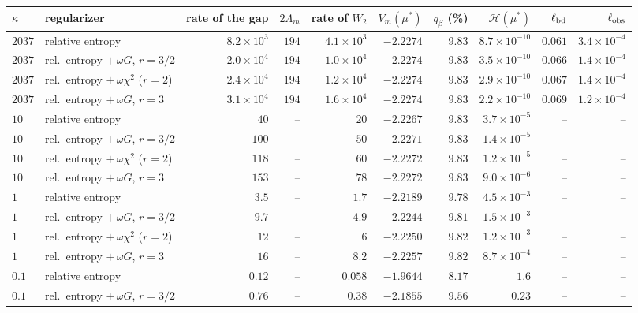 \setlength{\tabcolsep}{4pt}\begin{tabular}{llrrrrrrrr}
\toprule
$\kappa$ & regularizer & rate of the gap & $2\Lambda_m$ & rate of $W_2$ & $V_m(\mu^*)$ & $q_\beta$ (\%) & $\mathcal H(\mu^*)$ & $\ell_{\rm bd}$ & $\ell_{\rm obs}$ \\
\midrule
$2037$ & relative entropy & $8.2\times10^{3}$ & $194$ & $4.1\times10^{3}$ & $-2.2274$ & $9.83$ & $8.7\times10^{-10}$ & $0.061$ & $3.4\times10^{-4}$ \\
$2037$ & rel.\ entropy $+\,\omega G$, $r=3/2$ & $2.0\times10^{4}$ & $194$ & $1.0\times10^{4}$ & $-2.2274$ & $9.83$ & $3.5\times10^{-10}$ & $0.066$ & $1.4\times10^{-4}$ \\
$2037$ & rel.\ entropy $+\,\omega\chi^2$ ($r=2$) & $2.4\times10^{4}$ & $194$ & $1.2\times10^{4}$ & $-2.2274$ & $9.83$ & $2.9\times10^{-10}$ & $0.067$ & $1.4\times10^{-4}$ \\
$2037$ & rel.\ entropy $+\,\omega G$, $r=3$ & $3.1\times10^{4}$ & $194$ & $1.6\times10^{4}$ & $-2.2274$ & $9.83$ & $2.2\times10^{-10}$ & $0.069$ & $1.2\times10^{-4}$ \\
$10$ & relative entropy & $40$ & -- & $20$ & $-2.2267$ & $9.83$ & $3.7\times10^{-5}$ & -- & -- \\
$10$ & rel.\ entropy $+\,\omega G$, $r=3/2$ & $100$ & -- & $50$ & $-2.2271$ & $9.83$ & $1.4\times10^{-5}$ & -- & -- \\
$10$ & rel.\ entropy $+\,\omega\chi^2$ ($r=2$) & $118$ & -- & $60$ & $-2.2272$ & $9.83$ & $1.2\times10^{-5}$ & -- & -- \\
$10$ & rel.\ entropy $+\,\omega G$, $r=3$ & $153$ & -- & $78$ & $-2.2272$ & $9.83$ & $9.0\times10^{-6}$ & -- & -- \\
$1$ & relative entropy & $3.5$ & -- & $1.7$ & $-2.2189$ & $9.78$ & $4.5\times10^{-3}$ & -- & -- \\
$1$ & rel.\ entropy $+\,\omega G$, $r=3/2$ & $9.7$ & -- & $4.9$ & $-2.2244$ & $9.81$ & $1.5\times10^{-3}$ & -- & -- \\
$1$ & rel.\ entropy $+\,\omega\chi^2$ ($r=2$) & $12$ & -- & $6$ & $-2.2250$ & $9.82$ & $1.2\times10^{-3}$ & -- & -- \\
$1$ & rel.\ entropy $+\,\omega G$, $r=3$ & $16$ & -- & $8.2$ & $-2.2257$ & $9.82$ & $8.7\times10^{-4}$ & -- & -- \\
$0.1$ & relative entropy & $0.12$ & -- & $0.058$ & $-1.9644$ & $8.17$ & $1.6$ & -- & -- \\
$0.1$ & rel.\ entropy $+\,\omega G$, $r=3/2$ & $0.76$ & -- & $0.38$ & $-2.1855$ & $9.56$ & $0.23$ & -- & -- \\

\end{tabular}
